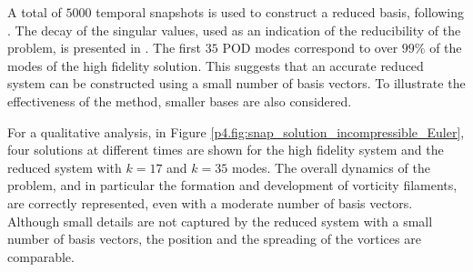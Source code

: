 A total of $5000$ temporal snapshots is used to construct a reduced basis, following . The decay of the singular values, used as an indication of the reducibility of the problem, is presented in . The first $35$ POD modes correspond to over $99\%$ of the modes of the high fidelity solution. This suggests that an accurate reduced system can be constructed using a small number of basis vectors. To illustrate the effectiveness of the method, smaller bases are also considered.

For a qualitative analysis, in Figure \ref{p4.fig:snap_solution_incompressible_Euler}, four solutions at different times are shown for the high fidelity system and the reduced system with $k=17$ and $k=35$ modes. The overall dynamics of the problem, and in particular the formation and development of vorticity filaments, are correctly represented, even with a moderate number of basis vectors. Although small details are not captured by the reduced system with a small number of basis vectors, the position and the spreading of the vortices are comparable.

